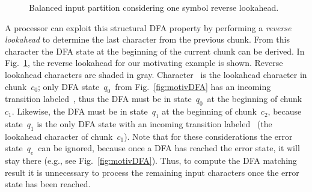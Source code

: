 \documentclass[smallextended]{svjour3}
\newcommand\State[1][{}]{\ensuremath{q_{#1}}}
\newcommand\StartState{\ensuremath{\State[0]}}
\newcommand\ErrorState{\ensuremath{\State[e]}}
\newcommand\Chunk[1][{}]{\ensuremath{c_{#1}}}
\begin{document}
\def\bsize{12.5pt}
\def\coff{60pt}
\def\ccoff{120pt}
\begin{figure}[H]
     \centering\vspace{3mm}
     \caption{Balanced input partition considering one symbol
              reverse lookahead.\label{fig:imax}}
\end{figure}

A processor can exploit this structural DFA property by performing
a {\em reverse lookahead\/} to determine the last character from the previous
chunk. From this character the DFA state at the beginning of the current chunk
can be derived. In Fig.~\ref{fig:imax}, the reverse lookahead for our motivating
example is shown. 
Reverse lookahead characters are shaded in gray.
Character~ is the lookahead character in chunk~\Chunk[0]; only DFA state~\StartState\ 
from Fig.~\ref{fig:motivDFA}
has an incoming transition labeled~, thus the DFA
must be in state~\StartState\ 
at the beginning of chunk~\Chunk[1].
Likewise, the DFA must be in state~\State[1] at the beginning of chunk~\Chunk[2],
because state~\State[1] is the only DFA state with an incoming transition
labeled~ (the lookahead character of chunk~\Chunk[1]).
Note that for these considerations the error state~\ErrorState\ can be ignored,
because once a DFA has reached the error state, it will stay there (e.g.,
see Fig.~\ref{fig:motivDFA}). Thus, to compute the DFA matching result
it is unnecessary to process the remaining input characters
once the error state has been reached.
\end{document}
